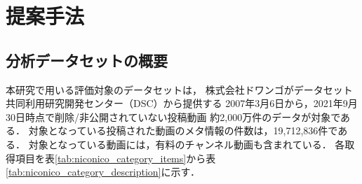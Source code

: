 \documentclass[submit,techrep,noauthor]{ipsj}
\begin{document}
\newpage
\section{提案手法}

\subsection{分析データセットの概要}\label{simulation}
本研究で用いる評価対象のデータセットは，
株式会社ドワンゴがデータセット共同利用研究開発センター（DSC）から提供する
2007年3月6日から，2021年9月30日時点で削除/非公開されていない投稿動画
約2,000万件のデータが対象である\cite{dwango_dataset}．
%
対象となっている投稿された動画のメタ情報の件数は，19,712,836件である．
対象となっている動画には，有料のチャンネル動画も含まれている．
各取得項目を表\ref{tab:niconico_category_items}から表\ref{tab:niconico_category_description}に示す．
\end{document}
